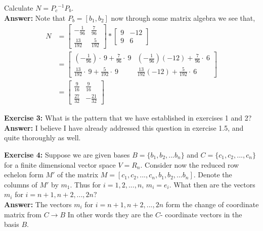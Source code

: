 \documentclass{amsart}
\begin{document}
\begin{enumerate}
\Item Calculate $N = {P_c}^{-1}P_b$.\\
\noindent \textbf{Answer: } Note that $P_b = [b_1,b_2]$ now through some matrix algebra we see that,
\begin{align*}
N &=
\begin{bmatrix}-\frac{1}{96}&\frac{7}{96}\\ \frac{13}{192}&\frac{5}{192}\end{bmatrix}
*
\begin{bmatrix}
9&-12\\
9&6
\end{bmatrix}\\
&=
\begin{bmatrix}\left(-\frac{1}{96}\right)\cdot \:9+\frac{7}{96}\cdot \:9&\left(-\frac{1}{96}\right)\left(-12\right)+\frac{7}{96}\cdot \:6\\ \frac{13}{192}\cdot \:9+\frac{5}{192}\cdot \:9&\frac{13}{192}\left(-12\right)+\frac{5}{192}\cdot \:6\end{bmatrix}\\
&=
\begin{bmatrix}\frac{9}{16}&\frac{9}{16}\\ \frac{27}{32}&-\frac{21}{32}\end{bmatrix}
\end{align*}
\vspace{.1in}
\end{enumerate}



\noindent\textbf{Exercise 3: } What is the pattern that we have established in exercises 1 and 2?\\
\noindent \textbf{Answer: } I believe I have already addressed this question in exercise 1.5, and quite thoroughly as well.
\vspace{.5in}

\noindent\textbf{Exercise 4: }Suppose we are given bases $B = \{b_1,b_2,...b_n\}$ and $C = \{c_1,c_2,...,c_n\}$ for a finite dimensional vector space $V = R_n.$ Consider now the reduced row echelon form $M′$ of the matrix $M = [c_1,c_2,...,c_n,b_1,b_2,...b_n].$ Denote the columns of $M′$ by $m_1$. Thus for $i = 1,2,...,n$, $m_i = e_i$. What then are the vectors $m_i$ for $i = n+1,n+2,...,2n?$\\
\noindent \textbf{Answer: } The vectors  $m_i$ for $i = n+1,n+2,...,2n$ form the change of coordinate matrix from $C \to B$ In other words they are the $C$- coordinate vectors in the basis $B$.
\vspace{.1in}
\end{document}
